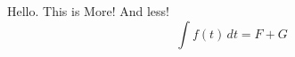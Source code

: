\documentclass[12pt,reqno]{amsart}
\begin{document}
Hello.
This is More!
And less!
$$\int f(t)\,dt=F+G$$
\end{document}
